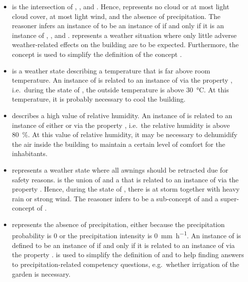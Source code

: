 \begin{itemize}
  \item {} is the intersection of , , and . Hence,  represents no cloud or at most light cloud cover, at most light wind, and the absence of precipitation. The  reasoner infers an instance of  to be an instance of  if and only if it is an instance of , , and .  represents a weather situation where only little adverse weather-related effects on the building are to be expected. Furthermore, the concept  is used to simplify the definition of the concept .
  
  \item {} is a weather state describing a temperature that is far above room temperature. An instance of  is related to an instance of  via the property , i.e.\ during the state of , the outside temperature is above \SI{30}{\celsius}. At this temperature, it is probably necessary to cool the building.
  
  \item {} describes a high value of relative humidity. An instance of  is related to an instance of either  or  via the property , i.e.\ the relative humidity is above \SI{80}{\percent}. At this value of relative humidity, it may be necessary to dehumidify the air inside the building to maintain a certain level of comfort for the inhabitants.
  
  \item {} represents a weather state where all awnings should be retracted due for safety reasons.  is the union of  and a  that is related to an instance of  via the property . Hence, during the state of , there is at storm together with heavy rain or strong wind. The  reasoner infers  to be a sub-concept of  and a super-concept of .
  
  \item {} represents the absence of precipitation, either because the precipitation probability is \num{0} or the precipitation intensity is \SI{0}{\milli\metre\per\hour}. An instance of  is defined to be an instance of  if and only if it is related to an instance of  via the property .  is used to simplify the definition of  and to help finding answers to precipitation-related competency questions, e.g.\ whether irrigation of the garden is necessary.
  

\end{itemize}
